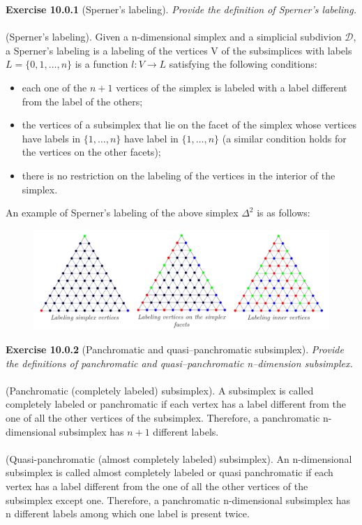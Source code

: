 \textbf{Exercise 10.0.1} (Sperner’s labeling). \textit{Provide the definition of Sperner’s labeling.}\\\\
(Sperner’s labeling). Given a n-dimensional simplex and a simplicial subdivion $ \mathcal{D} $, a Sperner’s labeling is a labeling of the vertices V of the subsimplices with labels $L = \{ 0, 1, \ldots, n \}$ is a function $l : V \rightarrow L$
satisfying the following conditions:
\begin{itemize}
\item each one of the $n+1$ vertices of the simplex is labeled with a label different from the label of the others;
\item the vertices of a subsimplex that lie on the facet of the simplex whose vertices have labels in $\{ 1, \ldots , n \}$ have label in $\{ 1, \ldots , n \}$ (a similar condition holds for the vertices on the other facets);
\item there is no restriction on the labeling of the vertices in the interior of the simplex.
\end{itemize}
An example of Sperner’s labeling of the above simplex $\Delta^2$ is as follows:
\begin{figure}[H]
\centering
\includegraphics[width=\textwidth]{images/img_2_10_01.png}
\end{figure}
\noindent
\textbf{Exercise 10.0.2} (Panchromatic and quasi–panchromatic subsimplex). \textit{Provide the definitions of panchromatic
and quasi–panchromatic n–dimension subsimplex.}\\\\
(Panchromatic (completely labeled) subsimplex). A subsimplex is called completely labeled or panchromatic if each vertex has a label different from the one of all the other vertices of the subsimplex. Therefore, a panchromatic n-dimensional subsimplex has $n+1$ different labels.\\\\
(Quasi-panchromatic (almost completely labeled) subsimplex). An n-dimensional subsimplex is called almost completely labeled or quasi panchromatic if each vertex has a label different from the one of all the other vertices of the subsimplex except one. Therefore, a panchromatic n-dimensional subsimplex has n different labels among which one label is present twice.\\\\
